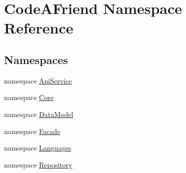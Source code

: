 \hypertarget{namespace_code_a_friend}{}\section{Code\+A\+Friend Namespace Reference}
\label{namespace_code_a_friend}
\subsection*{Namespaces}
\begin{DoxyCompactItemize}
\item 
namespace \mbox{\hyperlink{namespace_code_a_friend_1_1_api_service}{Api\+Service}}
\item 
namespace \mbox{\hyperlink{namespace_code_a_friend_1_1_core}{Core}}
\item 
namespace \mbox{\hyperlink{namespace_code_a_friend_1_1_data_model}{Data\+Model}}
\item 
namespace \mbox{\hyperlink{namespace_code_a_friend_1_1_facade}{Facade}}
\item 
namespace \mbox{\hyperlink{namespace_code_a_friend_1_1_languages}{Languages}}
\item 
namespace \mbox{\hyperlink{namespace_code_a_friend_1_1_repository}{Repository}}
\end{DoxyCompactItemize}
